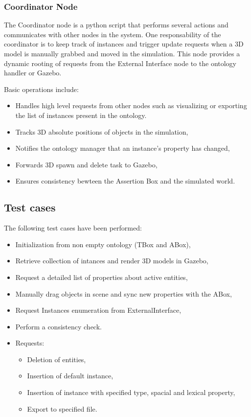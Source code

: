 \subsubsection{Coordinator Node}
The Coordinator node is a python script that performs several actions and communicates with other nodes in the system. One responsability of the coordinator is to keep track of instances and trigger update requests when a 3D model is manually grabbed and moved in the simulation. This node provides a dynamic rooting of requests from the External Interface node to the ontology handler or Gazebo. 

Basic operations include:

\begin{itemize}
\item Handles high level requests from other nodes such as visualizing or exporting the  list of instances present in the ontology.
\item Tracks 3D absolute positions of objects in the simulation,
\item Notifies the ontology manager that an instance's property has changed,
\item Forwards 3D spawn and delete task to Gazebo,
\item Ensures consistency bewteen the Assertion Box and the simulated world.
\end{itemize}

\subsection{Test cases}

The following test cases have been performed:

\begin{itemize}
\item Initialization from non empty ontology (TBox and ABox),
\item Retrieve collection of intances and render 3D models in Gazebo,
\item Request a detailed list of properties about active entities,
\item Manually drag objects in scene and sync new properties with the ABox,
\item Request Instances enumeration from ExternalInterface,
\item Perform a consistency check.
\item Requests:
	\begin{itemize}
		\item Deletion of entities,
		\item Insertion of default instance,
		\item Insertion of instance with specified type, spacial and lexical property,
		\item Export to specified file.
	\end{itemize}
\end{itemize}